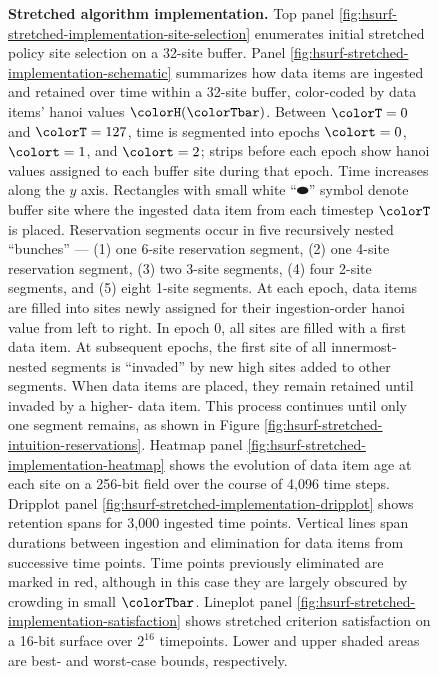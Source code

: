 \begin{figure}[htbp!]
\vspace{-2ex}\caption{%
  \textbf{Stretched algorithm implementation.}
  \footnotesize
  Top panel \ref{fig:hsurf-stretched-implementation-site-selection} enumerates initial stretched policy site selection on a 32-site buffer.
  Panel \ref{fig:hsurf-stretched-implementation-schematic} summarizes how data items are ingested and retained over time within a 32-site buffer, color-coded by data items' hanoi values $\colorH(\colorTbar)$.
  Between $\colorT=0$ and $\colorT=127$, time is segmented into epochs $\colort=0$, $\colort=1$, and $\colort=2$; strips before  each epoch show hanoi values assigned to each buffer site during that epoch.
  Time increases along the $y$ axis.
  Rectangles with small white ``$\blkhorzoval$'' symbol denote buffer site where the ingested data item from each timestep $\colorT$ is placed.
  Reservation segments occur in five recursively nested ``bunches'' --- (1) one 6-site reservation segment, (2) one 4-site reservation segment, (3) two 3-site segments, (4) four 2-site segments, and (5) eight 1-site segments.
  At each epoch, data items are filled into sites newly assigned for their ingestion-order hanoi value from left to right.
  In epoch 0, all sites are filled with a first data item.
  At subsequent epochs, the first site of all innermost-nested segments is ``invaded'' by new high \hv{} sites added to other segments.
  When data items are placed, they remain retained until invaded by a higher-\hv{} data item.
  This process continues until only one segment remains, as shown in Figure \ref{fig:hsurf-stretched-intuition-reservations}.
  Heatmap panel \ref{fig:hsurf-stretched-implementation-heatmap} shows the evolution of data item age at each site on a 256-bit field over the course of 4,096 time steps.
  Dripplot panel \ref{fig:hsurf-stretched-implementation-dripplot} shows retention spans for 3,000 ingested time points.
  Vertical lines span durations between ingestion and elimination for data items from successive time points.
  Time points previously eliminated are marked in red, although in this case they are largely obscured by crowding in small $\colorTbar$.
  Lineplot panel \ref{fig:hsurf-stretched-implementation-satisfaction} shows stretched criterion satisfaction on a 16-bit surface over $2^{16}$ timepoints.
  Lower and upper shaded areas are best- and worst-case bounds, respectively.
  }
\label{fig:hsurf-stretched-implementation}

\end{figure}
